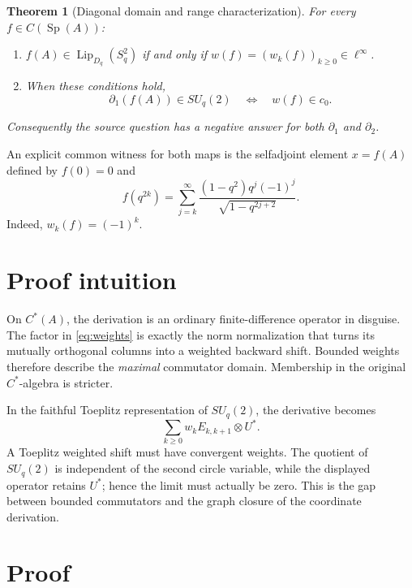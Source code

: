\documentclass[11pt]{article}
\newtheorem{theorem}{Theorem}
\newcommand{\Lip}{\operatorname{Lip}}
\newcommand{\SU}{SU_q(2)}
\newcommand{\Sq}{S_q^2}
\numberwithin{equation}{section}
\begin{document}
\begin{theorem}[Diagonal domain and range characterization]\label{thm:main}
For every $f\in C(\operatorname{Sp}(A))$:
\begin{enumerate}
\item $f(A)\in\Lip_{D_q}(\Sq)$ if and only if
      $w(f)=(w_k(f))_{k\geq0}\in\ell^\infty$.
\item When these conditions hold,
\[
 \partial_1(f(A))\in\SU
 \quad\Longleftrightarrow\quad w(f)\in c_0.
\]
\end{enumerate}
Consequently the source question has a negative answer for both
$\partial_1$ and $\partial_2$.
\end{theorem}

An explicit common witness for both maps is the selfadjoint element $x=f(A)$
defined by $f(0)=0$ and
\begin{equation}
 f(q^{2k})=
 \sum_{j=k}^{\infty}
 \frac{(1-q^2)q^j(-1)^j}{\sqrt{1-q^{2j+2}}}.                     \label{eq:witness}
\end{equation}
Indeed, $w_k(f)=(-1)^k$.

\section{Proof intuition}

On $C^*(A)$, the derivation is an ordinary finite-difference operator in
disguise.  The factor in \eqref{eq:weights} is exactly the norm normalization that turns
its mutually orthogonal columns into a weighted backward shift.  Bounded
weights therefore describe the \emph{maximal} commutator domain.  Membership
in the original $C^*$-algebra is stricter.

In the faithful Toeplitz representation of $\SU$, the derivative becomes
\[
 \sum_{k\geq0}w_k E_{k,k+1}\otimes U^*.
\]
A Toeplitz weighted shift must have convergent weights.  The quotient of
$\SU$ is independent of the second circle variable, while the displayed
operator retains $U^*$; hence the limit must actually be zero.  This is the
gap between bounded commutators and the graph closure of the coordinate
derivation.

\section{Proof}
\end{document}
